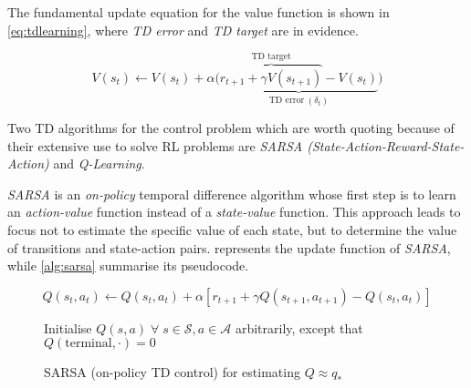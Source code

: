 The fundamental update equation for the value function is shown in \vref{eq:tdlearning}, where \textit{TD error} and \textit{TD target} are in evidence.

 \begin{equation}\label{eq:tdlearning}
	V(s_t) \leftarrow V(s_t) + \alpha \big(\underbrace{\overbrace{r_{t+1} + \gamma V(s_{t+1})}^{\text{TD target}}- V(s_t)}_{\text{TD error} \ (\delta_t)}\big)
\end{equation}

Two TD algorithms for the control problem which are worth quoting because of their extensive use to solve RL problems are \textit{SARSA (State-Action-Reward-State-Action)} and \textit{Q-Learning}.

\textit{SARSA} is an \textit{on-policy} temporal difference algorithm whose first step is to learn an \textit{action-value} function instead of a \textit{state-value} function. This approach leads to focus not to estimate the specific value of each state, but to determine the value of transitions and state-action pairs.  represents the update function of \textit{SARSA}, while \vref{alg:sarsa} summarise its pseudocode.

\begin{equation}\label{eq:sarsa}
Q(s_t, a_t) \leftarrow Q(s_t, a_t) + \alpha [r_{t+1} + \gamma Q(s_{t+1}, a_{t+1}) - Q(s_t, a_t)]
\end{equation}

\begin{figure}
	
	\begin{algorithm}[H]
		\SetAlgoLined
		\DontPrintSemicolon
		\LinesNumbered
		\KwIn{step size $\alpha \in (0,1]$, small $\epsilon > 0$\;}
		Initialise $Q(s,a) \; \forall\; s \in \mathcal{S}, a \in \mathcal{A}$ arbitrarily, except that $Q(\text{terminal}, \cdot) = 0$\;
		\caption{SARSA (on-policy TD control) for estimating $Q \approx q_*$}
		\label{alg:sarsa}
	\end{algorithm}
\end{figure}

